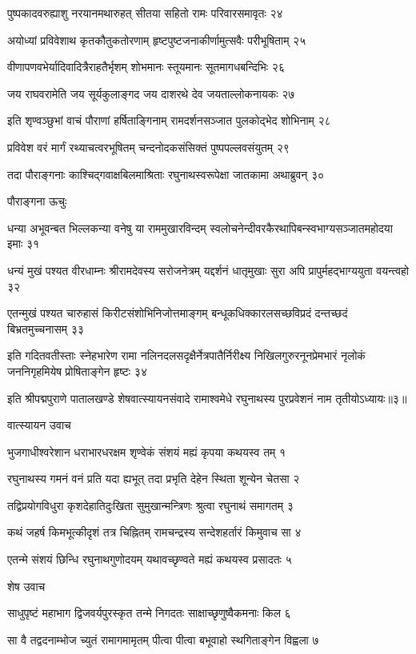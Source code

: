 पुष्पकादवरुह्याशु नरयानमथारुहत्
सीतया सहितो रामः परिवारसमावृतः २४

अयोध्यां प्रविवेशाथ कृतकौतुकतोरणाम्
हृष्टपुष्टजनाकीर्णामुत्सवैः परीभूषिताम् २५

वीणापणवभेर्यादिवादित्रैराहतैर्भृशम्
शोभमानः स्तूयमानः सूतमागधबन्दिभिः २६

जय राघवरामेति जय सूर्यकुलाङ्गद
जय दाशरथे देव जयताल्लोकनायकः २७

इति शृण्वञ्छुभां वाचं पौराणां हर्षिताङ्गिनाम्
रामदर्शनसञ्जात पुलकोद्भेद शोभिनाम् २८

प्रविवेश वरं मार्गं रथ्याचत्वरभूषितम्
चन्दनोदकसंसिक्तं पुष्पपल्लवसंयुतम् २९

तदा पौराङ्गनाः काश्चिद्गवाक्षबिलमाश्रिताः
रघुनाथस्वरूपेक्षा जातकामा अथाब्रुवन् ३०

पौराङ्गना ऊचुः

धन्या अभूवन्बत भिल्लकन्या वनेषु या राममुखारविन्दम्
स्वलोचनेन्दीवरकैरथापिबन्स्वभाग्यसञ्जातमहोदया इमाः ३१

धन्यं मुखं पश्यत वीरधाम्नः श्रीरामदेवस्य सरोजनेत्रम्
यद्दर्शनं धातृमुखाः सुरा अपि प्रापुर्महद्भाग्ययुता वयन्त्वहो ३२

एतन्मुखं पश्यत चारुहासं किरीटसंशोभिनिजोत्तमाङ्गम्
बन्धूकधिक्कारलसच्छविप्रदं दन्तच्छदं बिभ्रतमुच्चनासम् ३३

इति गदितवतीस्ताः स्नेहभारेण रामा नलिनदलसदृक्षैर्नेत्रपातैर्निरीक्ष्य
निखिलगुरुरनूनप्रेमभारं नृलोकं जननिगृहमियेष प्रोषिताङ्गेन हृष्टः ३४

इति श्रीपद्मपुराणे पातालखण्डे शेषवात्स्यायनसंवादे रामाश्वमेधे रघुनाथस्य पुरप्रवेशनं नाम तृतीयोऽध्यायः॥३॥


वात्स्यायन उवाच

भुजगाधीश्वरेशान धराभारधरक्षम
शृण्वेकं संशयं मह्यं कृपया कथयस्व तम् १

रघुनाथस्य गमनं वनं प्रति यदा ह्यभूत्
तदा प्रभृति देहेन स्थिता शून्येन चेतसा २

तद्विप्रयोगविधुरा कृशदेहातिदुःखिता
सुमुखान्मन्त्रिणः श्रुत्वा रघुनाथं समागतम् ३

कथं जहर्ष किमभूत्कीदृशं तत्र चिह्नितम्
रामचन्द्रस्य सन्देशहर्तारं किमुवाच सा ४

एतन्मे संशयं छिन्धि रघुनाथगुणोदयम्
यथावच्छृण्वते मह्यं कथयस्व प्रसादतः ५

शेष उवाच

साधुपृष्टं महाभाग द्विजवर्यपुरस्कृत
तन्मे निगदतः साक्षाच्छृणुष्वैकमनाः किल ६

सा वै तद्वदनाम्भोज च्युतं रामागमामृतम्
पीत्वा पीत्वा बभूवाहो स्थगिताङ्गेन विह्वला ७

